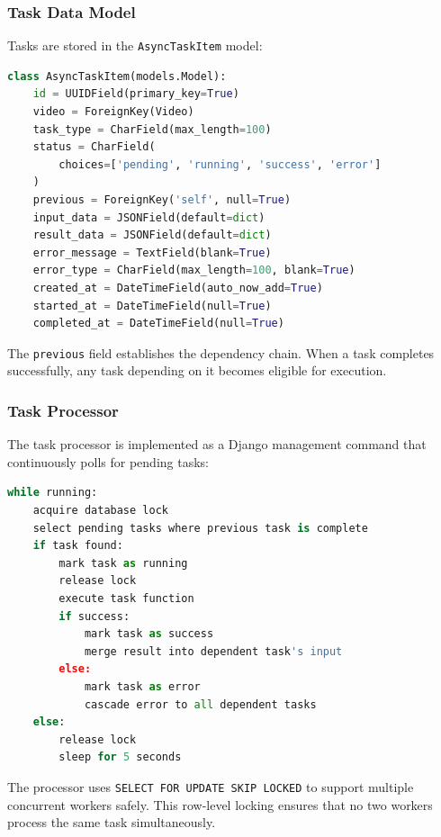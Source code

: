 \subsubsection{Task Data Model}

Tasks are stored in the \texttt{AsyncTaskItem} model:

\begin{lstlisting}[language=Python, caption={AsyncTaskItem Database Model}]
class AsyncTaskItem(models.Model):
    id = UUIDField(primary_key=True)
    video = ForeignKey(Video)
    task_type = CharField(max_length=100)
    status = CharField(
        choices=['pending', 'running', 'success', 'error']
    )
    previous = ForeignKey('self', null=True)
    input_data = JSONField(default=dict)
    result_data = JSONField(default=dict)
    error_message = TextField(blank=True)
    error_type = CharField(max_length=100, blank=True)
    created_at = DateTimeField(auto_now_add=True)
    started_at = DateTimeField(null=True)
    completed_at = DateTimeField(null=True)
\end{lstlisting}

The \texttt{previous} field establishes the dependency chain. When a task completes successfully, any task depending on it becomes eligible for execution.

\subsubsection{Task Processor}

The task processor is implemented as a Django management command that continuously polls for pending tasks:

\begin{lstlisting}[language=Python, caption={Async Task Processor Loop}, label={alg:task-processor}]
while running:
    acquire database lock
    select pending tasks where previous task is complete
    if task found:
        mark task as running
        release lock
        execute task function
        if success:
            mark task as success
            merge result into dependent task's input
        else:
            mark task as error
            cascade error to all dependent tasks
    else:
        release lock
        sleep for 5 seconds
\end{lstlisting}

The processor uses \texttt{SELECT FOR UPDATE SKIP LOCKED} to support multiple concurrent workers safely. This row-level locking ensures that no two workers process the same task simultaneously.

